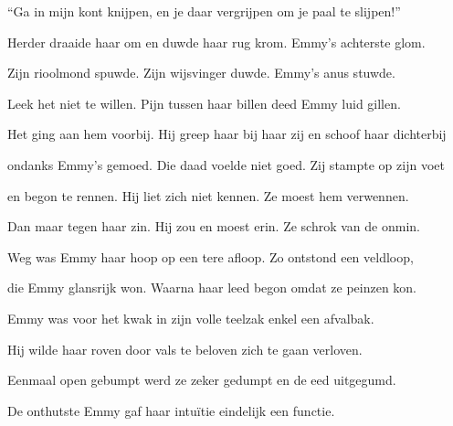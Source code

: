 “Ga in mijn kont knijpen,
en je daar vergrijpen
om je paal te slijpen!”

Herder draaide haar om
en duwde haar rug krom.
Emmy’s achterste glom.

Zijn rioolmond spuwde.
Zijn wijsvinger duwde.
Emmy’s anus stuwde.

Leek het niet te willen.
Pijn tussen haar billen
deed Emmy luid gillen.

Het ging aan hem voorbij.
Hij greep haar bij haar zij
en schoof haar dichterbij

ondanks Emmy’s gemoed.
Die daad voelde niet goed.
Zij stampte op zijn voet

en begon te rennen.
Hij liet zich niet kennen.
Ze moest hem verwennen.

Dan maar tegen haar zin.
Hij zou en moest erin.
Ze schrok van de onmin.

Weg was Emmy haar hoop
op een tere afloop.
Zo ontstond een veldloop,

die Emmy glansrijk won.
Waarna haar leed begon
omdat ze peinzen kon.

Emmy was voor het kwak
in zijn volle teelzak
enkel een afvalbak.

Hij wilde haar roven
door vals te beloven
zich te gaan verloven.

Eenmaal open gebumpt
werd ze zeker gedumpt
en de eed uitgegumd.

De onthutste Emmy
gaf haar intuïtie
eindelijk een functie.
